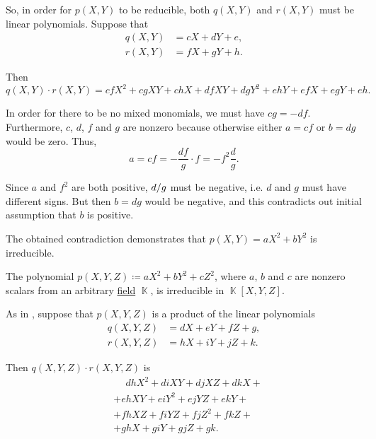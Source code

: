 \begin{example}
\begin{thmenum}
    So, in order for \( p(X, Y) \) to be reducible, both \( q(X, Y) \) and \( r(X, Y) \) must be linear polynomials. Suppose that
    \begin{align*}
      q(X, Y) &= c X + d Y + e, \\
      r(X, Y) &= f X + g Y + h.
    \end{align*}

    Then
    \begin{equation*}
      q(X, Y) \cdot r(X, Y) = c f X^2 + c g X Y + c h X + d f X Y + d g Y^2 + e h Y + e f X + e g Y + e h.
    \end{equation*}

    In order for there to be no mixed monomials, we must have \( c g = - d f \). Furthermore, \( c \), \( d \), \( f \) and \( g \) are nonzero because otherwise either \( a = c f \) or \( b = d g \) would be zero. Thus,
    \begin{equation*}
      a = c f = - \frac {df} g \cdot f = -f^2 \frac d g.
    \end{equation*}

    Since \( a \) and \( f^2 \) are both positive, \( \ifrac d g \) must be negative, i.e. \( d \) and \( g \) must have different signs. But then \( b = d g \) would be negative, and this contradicts out initial assumption that \( b \) is positive.

    The obtained contradiction demonstrates that \( p(X, Y) = a X^2 + b Y^2 \) is irreducible.

     The polynomial \( p(X, Y, Z) \coloneqq a X^2 + b Y^2 + c Z^2 \), where \( a \), \( b \) and \( c \) are nonzero scalars from an arbitrary \hyperref[def:field]{field} \( \BbbK \), is irreducible in \( \BbbK[X, Y, Z] \).

    As in , suppose that \( p(X, Y, Z) \) is a product of the linear polynomials
    \begin{align*}
      q(X, Y, Z) &= d X + e Y + f Z + g, \\
      r(X, Y, Z) &= h X + i Y + j Z + k.
    \end{align*}

    Then \( q(X, Y, Z) \cdot r(X, Y, Z) \) is
    \begin{align*}
      &\phantom{{}+{}}
      d h X^2 + d i X Y + d j X Z + d k X
      + \\ &+
      e h X Y + e i Y^2 + e j Y Z + e k Y
      + \\ &+
      f h X Z + f i Y Z + f j Z^2 + f k Z
      + \\ &+
      g h X + g i Y + g j Z + g k.
    \end{align*}


\end{thmenum}
\end{example}
